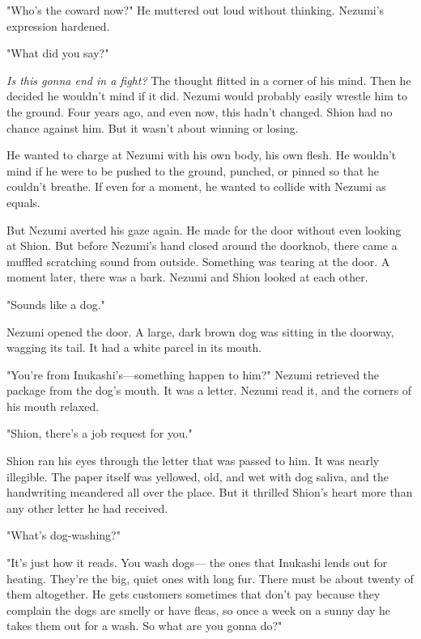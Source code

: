 "Who's the coward now?" He muttered out loud without thinking. Nezumi's
expression hardened.

"What did you say?"

\emph{Is this gonna end in a fight?} The thought flitted in a corner of his
mind. Then he decided he wouldn't mind if it did. Nezumi would probably
easily wrestle him to the ground. Four years ago, and even now, this
hadn't changed. Shion had no chance against him. But it wasn't about
winning or losing.

He wanted to charge at Nezumi with his own body, his own flesh. He
wouldn't mind if he were to be pushed to the ground, punched, or pinned
so that he couldn't breathe. If even for a moment, he wanted to collide
with Nezumi as equals.

But Nezumi averted his gaze again. He made for the door without even
looking at Shion. But before Nezumi's hand closed around the doorknob,
there came a muffled scratching sound from outside. Something was
tearing at the door. A moment later, there was a bark. Nezumi and Shion
looked at each other.

"Sounds like a dog."

Nezumi opened the door. A large, dark brown dog was sitting in the
doorway, wagging its tail. It had a white parcel in its mouth.

"You're from Inukashi's---something happen to him?" Nezumi retrieved the
package from the dog's mouth. It was a letter. Nezumi read it, and the
corners of his mouth relaxed.

"Shion, there's a job request for you."

Shion ran his eyes through the letter that was passed to him. It was
nearly illegible. The paper itself was yellowed, old, and wet with dog
saliva, and the handwriting meandered all over the place. But it
thrilled Shion's heart more than any other letter he had received.


"What's dog-washing?"

"It's just how it reads. You wash dogs--- the ones that Inukashi lends out
for heating. They're the big, quiet ones with long fur. There must be
about twenty of them altogether. He gets customers sometimes that don't
pay because they complain the dogs are smelly or have fleas, so once a
week on a sunny day he takes them out for a wash. So what are you gonna
do?"

